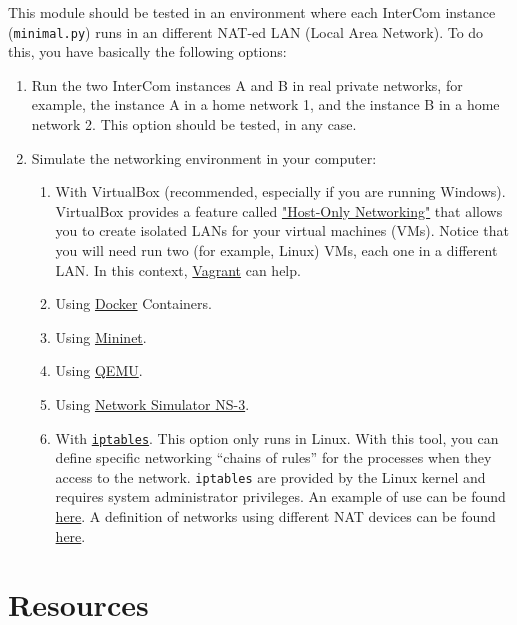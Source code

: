 This module should be tested in an environment where each InterCom
instance (\texttt{minimal.py}) runs in an different NAT-ed LAN (Local
Area Network). To do this, you have basically the following options:
\begin{enumerate}
\item Run the two InterCom instances A and B in real private networks,
  for example, the instance A in a home network 1, and the instance B
  in a home network 2. This option should be tested, in any case.
\item Simulate the networking environment in your computer:
  \begin{enumerate}
  \item With VirtualBox (recommended, especially if you are running
    Windows). VirtualBox provides a feature called
    \href{https://www.virtualbox.org/manual/ch06.html#network_hostonly}{"Host-Only
      Networking"} that allows you to create isolated LANs for your
    virtual machines (VMs). Notice that you will need run two (for
    example, Linux) VMs, each one in a different LAN. In this context,
    \href{https://www.vagrantup.com/}{Vagrant} can help.
  \item Using \href{https://www.docker.com/}{Docker} Containers.
  \item Using \href{http://mininet.org/}{Mininet}.
  \item Using \href{https://www.qemu.org/}{QEMU}.
  \item Using \href{https://www.nsnam.org/}{Network Simulator NS-3}.
  \item With
    \href{https://en.wikipedia.org/wiki/Iptables}{\texttt{iptables}}. This
    option only runs in Linux. With this tool, you can define specific
    networking ``chains of rules'' for the processes when they access
    to the network. \texttt{iptables} are provided by the Linux kernel
    and requires system administrator privileges. An example of use
    can be found
    \href{https://github.com/P2PSP/console/blob/master/src/setup_NAT_network.sh}{here}. A
    definition of networks using different NAT devices can be found
    \href{https://github.com/P2PSP/core/tree/master/doc/NTS/iptables}{here}.
  \end{enumerate}
\end{enumerate}

\section{Resources}


